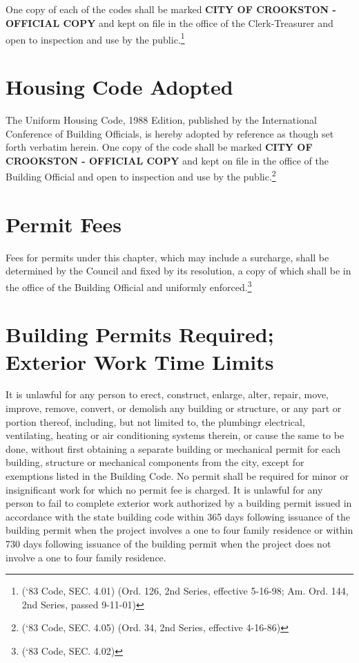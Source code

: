 \subsection{}
One copy of each of the codes shall be marked \textbf{CITY OF CROOKSTON - OFFICIAL COPY} and kept on file in the office of the Clerk-Treasurer and open to inspection and use by the public.\footnote{(‘83 Code, SEC. 4.01)  (Ord. 126, 2nd Series, effective 5-16-98; Am. Ord. 144, 2nd Series, passed 9-11-01)}
\section{Housing Code Adopted}
The Uniform Housing Code, 1988 Edition, published by the International Conference of Building Officials, is hereby adopted by reference as though set forth verbatim herein.  One copy of the code shall be marked \textbf{CITY OF CROOKSTON - OFFICIAL COPY} and kept on file in the office of the Building Official and open to inspection and use by the public.\footnote{(‘83 Code, SEC. 4.05)  (Ord. 34, 2nd Series, effective 4-16-86)}
\section{Permit Fees}
Fees for permits under this chapter, which may include a surcharge, shall be determined by the Council and fixed by its resolution, a copy of which shall be in the office of the Building Official and uniformly enforced.\footnote{(‘83 Code, SEC. 4.02)}
\section{Building Permits Required; Exterior Work Time Limits}
It is unlawful for any person to erect, construct, enlarge, alter, repair, move, improve, remove, convert, or demolish any building or structure, or any part or portion thereof, including, but not limited to, the plumbingr electrical, ventilating, heating or air conditioning systems therein, or cause the same to be done, without first obtaining a separate building or mechanical permit for each building, structure or mechanical components from the city, except for exemptions listed in the Building Code. No permit shall be required for minor or insignificant work for which no permit fee is charged. It is unlawful for any person to fail to complete exterior work authorized by a building permit issued in accordance with the state building code within 365 days following issuance of the building permit when the project involves a one to four family residence or within 730 days following issuance of the building permit when the project does not involve a one to four family residence.
